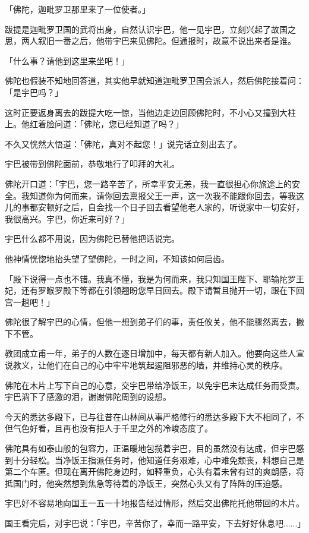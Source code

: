\documentclass[twoside,openany]{book}
\begin{document}
「佛陀，迦毗罗卫那里来了一位使者。」

跋提是迦毗罗卫国的武将出身，自然认识宇巴，他一见宇巴，立刻兴起了故国之思，两人叙旧一番之后，他带宇巴来见佛陀。但通报时，故意不说出来者是谁。

「什么事？请他到这里来坐吧！」

佛陀也假装不知地回答道，其实他早就知道迦毗罗卫国会派人，然后佛陀接着问：「是宇巴吗？」

这时正要返身离去的跋提大吃一惊，当他边走边回顾佛陀时，不小心又撞到大柱上。他红着脸问道：「佛陀，您已经知道了吗？」

不久又恍然大悟道：「佛陀，真对不起您！」说完话立刻出去了。

宇巴被带到佛陀面前，恭敬地行了叩拜的大礼。

佛陀开口道：「宇巴，您一路辛苦了，所幸平安无恙，我一直很担心你旅途上的安全。我知道你为何而来，请你回去禀报父王一声，这一次我不能跟你回去，等我这儿的事都安顿好之后，自会找一个日子回去看望他老人家的，听说家中一切安好，我很高兴。宇巴，你近来可好？」

宇巴什么都不用说，因为佛陀已替他把话说完。

他神情恍惚地抬头望了望佛陀，一时之间，不知该如何启齿。

「殿下说得一点也不错。我真不懂，我是为何而来，我只知国王陛下、耶输陀罗王妃，还有罗睺罗殿下等都在引领翘盼您早日回去。殿下请暂且抛开一切，跟在下回宫一趟吧！」

佛陀很了解宇巴的心情，但他一想到弟子们的事，责任攸关，他不能骤然离去，撇下不管。

教团成立甫一年，弟子的人数在逐日增加中，每天都有新人加入。他要向这些人宣说教义，让他们在自己的心中牢牢地筑起遏阻邪恶的墙，并维持心灵的秩序。

佛陀在木片上写下自己的心意，交宇巴带给净饭王，以免宇巴未达成任务而受责。宇巴淌下了感激的泪，谢谢佛陀周到的设想。

今天的悉达多殿下，已与往昔在山林间从事严格修行的悉达多殿下大不相同了，不但气色好看，且再也没有拒人于千里之外的冷峻态度了。

佛陀具有如泰山般的包容力，正温暖地包揽着宇巴，目的虽然没有达成，但宇巴感到十分轻松。当净饭王指派任务时，他知道任务艰难，心中难免颓丧，料想自己是第二个车匿。但现在离开佛陀身边时，如释重负，心头有着未曾有过的爽朗感，将抵国门时，他突然想到焦急等待着的净饭王，突然心头又有了阵阵的压迫感。

宇巴好不容易地向国王一五一十地报告经过情形，然后交出佛陀托他带回的木片。

国王看完后，对宇巴说：「宇巴，辛苦你了，幸而一路平安，下去好好休息吧......」
\end{document}
